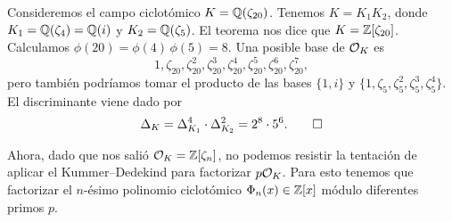 \begin{ejemplo}
  Consideremos el campo ciclotómico $K = \mathbb{Q} (\zeta_{20})$. Tenemos
  $K = K_1 K_2$, donde $K_1 = \mathbb{Q} (\zeta_4) = \mathbb{Q} (i)$ y $K_2 = \mathbb{Q} (\zeta_5)$.
  El teorema nos dice que $K = \mathbb{Z} [\zeta_{20}]$. Calculamos
  $\phi (20) = \phi (4) \, \phi (5) = 8$. Una posible base de $\mathcal{O}_K$ es
  \[ 1, \zeta_{20}, \zeta_{20}^2, \zeta_{20}^3,
     \zeta_{20}^4, \zeta_{20}^5, \zeta_{20}^6, \zeta_{20}^7, \]
  pero también podríamos tomar el producto de las bases $\{ 1, i \}$ y
  $\{ 1, \zeta_5, \zeta_5^2, \zeta_5^3, \zeta_5^4 \}$.
  El discriminante viene dado por
  \[ \Delta_K = \Delta_{K_1}^4 \cdot \Delta_{K_2}^2 = 2^8\cdot 5^6. \qedhere \]
\end{ejemplo}

\vspace{1em}


Ahora, dado que nos salió $\mathcal{O}_K = \mathbb{Z} [\zeta_n]$, no podemos resistir
la tentación de aplicar el Kummer--Dedekind para factorizar $p \mathcal{O}_K$.
Para esto tenemos que factorizar el $n$-ésimo polinomio ciclotómico
$\Phi_n (x) \in \mathbb{Z} [x]$ módulo diferentes primos $p$.


